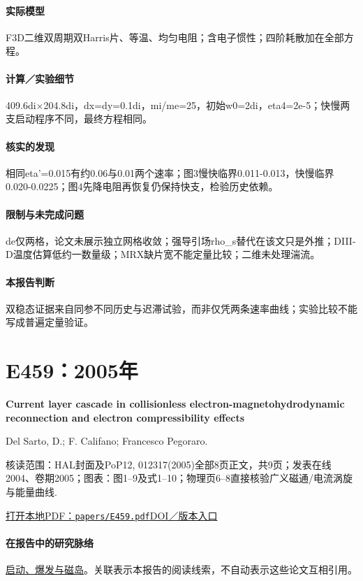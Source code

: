 \documentclass[UTF8,a4paper,11pt,openany,fontset=fandol]{ctexbook}
\begin{document}
\paragraph{实际模型}F3D二维双周期双Harris片、等温、均匀电阻；含电子惯性；四阶耗散加在全部方程。

\paragraph{计算／实验细节}409.6di×204.8di，dx=dy=0.1di，mi/me=25，初始w0=2di，eta4=2e-5；快慢两支启动程序不同，最终方程相同。

\paragraph{核实的发现}相同eta'=0.015有约0.06与0.01两个速率；图3慢快临界0.011-0.013，快慢临界0.020-0.0225；图4先降电阻再恢复仍保持快支，检验历史依赖。

\paragraph{限制与未完成问题}de仅两格，论文未展示独立网格收敛；强导引场rho\_s替代在该文只是外推；DIII-D温度估算低约一数量级；MRX缺片宽不能定量比较；二维未处理湍流。

\paragraph{本报告判断}双稳态证据来自同参不同历史与迟滞试验，而非仅凭两条速率曲线；实验比较不能写成普遍定量验证。

\section{E459：2005年}\label{paper:E459}

\textbf{Current layer cascade in collisionless electron-magnetohydrodynamic reconnection and electron compressibility effects}\citep{E459}\

Del Sarto,  D.;  F. Califano;  Francesco Pegoraro.

\textsf{核读范围：}HAL封面及PoP12, 012317(2005)全部8页正文，共9页；发表在线2004、卷期2005；\textsf{图表：}图1–9及式1–10；物理页6–8直接核验广义磁通/电流涡旋与能量曲线.

\href{run:../papers/E459.pdf}{打开本地PDF：\texttt{papers/E459.pdf}}\quad\href{https://doi.org/10.1063/1.1829064}{DOI／版本入口}

\paragraph{在报告中的研究脉络}\hyperref[story:onset]{启动、爆发与磁岛}。关联表示本报告的阅读线索，不自动表示这些论文互相引用。
\end{document}
